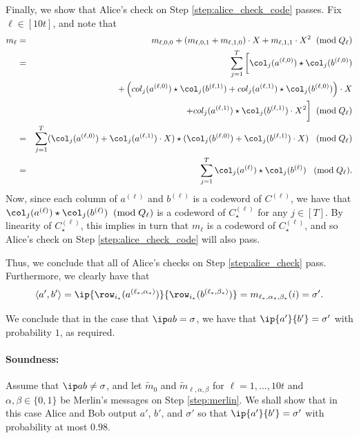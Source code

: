 \documentclass[11pt]{article}
\begin{document}
Finally, we show that Alice's check on Step \ref{step:alice_check_code} passes. Fix $\ell \in [10 t]$, and note that
\begin{eqnarray}\label{eq:complete_4}
\nonumber
m_\ell & =&  m_{\ell,0,0}   + ( m_{\ell,0,1}   + m_{\ell,1,0} ) \cdot X +  m_{\ell,1,1}   \cdot X^2   \;\;(\mathrm{mod} \;Q_\ell) \\ \nonumber
& = & \sum_{j=1}^T \bigg[ \col_{j}(a^{(\ell,0)}) \star \col_j(b^{(\ell,0)}) \\ \nonumber
&&  +  \left( col_{j}(a^{(\ell,0)}) \star \col_j(b^{(\ell,1)}) +col_{j}(a^{(\ell,1)}) \star \col_j(b^{(\ell,0)})  \right) \cdot X   \\  \nonumber
&& +  col_{j}(a^{(\ell,1)}) \star \col_j(b^{(\ell,1)})    \cdot X^2 \bigg]  \;\;(\mathrm{mod} \;Q_\ell)
 \\ \nonumber
&= &\sum_{j=1}^T ( \col_{j} (a^{(\ell,0)}) + \col_{j} (a^{(\ell,1)})\cdot X)\star ( \col_{j} (b^{(\ell,0)}) + \col_{j} (b^{(\ell,1)})\cdot X) \;\;\;(\mathrm{mod} \;Q_\ell)\\
&= &\sum_{j=1}^T \col_{j}(a^{(\ell)}) \star \col_j(b^{(\ell)})  \;\;\;(\mathrm{mod} \;Q_\ell).
\end{eqnarray}
Now, since each column of $a^{(\ell)}$ and $b^{(\ell)}$ is a codeword of $C^{(\ell)}$, we have that $\col_{j}(a^{(\ell)}) \star \col_j(b^{(\ell)}) \;\;(\mathrm{mod} \;Q_\ell)$ is a codeword of $C_\star^{(\ell)}$ for any $j \in [T]$. By linearity 
of $C_\star^{(\ell)}$, this implies in turn that $m_\ell$ is a codeword of $C_\star^{(\ell)}$, 
and so Alice's check on Step \ref{step:alice_check_code} will also pass.

Thus, we conclude that all of Alice's checks on Step \ref{step:alice_check} pass.
Furthermore, we clearly have that 
$$\langle  a', b' \rangle  =\ip {\row_{i_*}(a^{(\ell_*,\alpha_*)})} {\row_{i_*}(b^{({\ell_*},\beta_*)})} = m_{\ell_*,\alpha_*, \beta_*} (i) = \sigma'.$$

We conclude that in the case that $\ip a b = \sigma$, we have that $\ip {a'} {b'} = \sigma'$ with probability $1$, as required.

\paragraph{Soundness:}
Assume that $\ip a b \neq \sigma$, and let  $\tilde m_0$ and $\tilde m_{\ell,\alpha, \beta}$ for $\ell=1, \ldots, 10 t$ and $\alpha, \beta \in \{0,1\}$ be Merlin's messages on Step \ref{step:merlin}. We shall show that in this case Alice and Bob output $a'$, $b'$, and $\sigma'$ so that $\ip {a'} {b'} = \sigma'$ with probability at most $0.98$.
\end{document}
